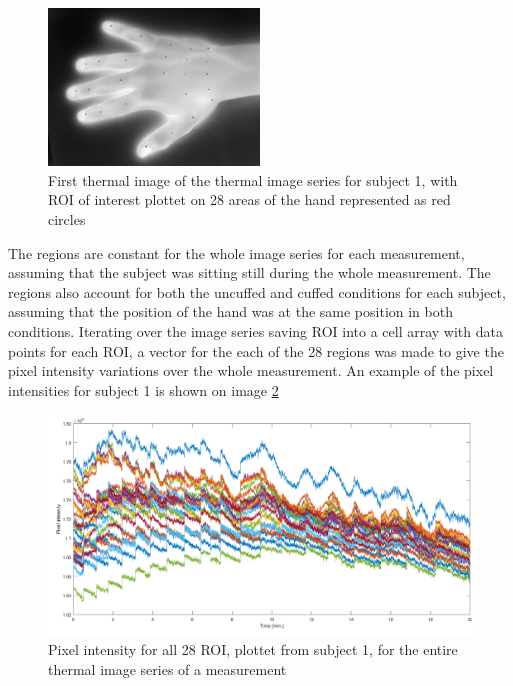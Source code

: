 \begin{figure}[H]
	\includegraphics[width=0.5\textwidth]{figures/roiHand}  %
	\caption{First thermal image of the thermal image series for subject 1, with ROI of interest plottet on 28 areas of the hand represented as red circles}
	\label{fig:roiHand}  %
\end{figure}

The regions are constant for the whole image series for each measurement, assuming that the subject was sitting still during the whole measurement. The regions also account for both the uncuffed and cuffed conditions for each subject, assuming that the position of the hand was at the same position in both conditions. 
Iterating over the image series saving ROI into a cell array with data points for each ROI, a vector for the each of the 28 regions was made to give the pixel intensity variations over the whole measurement. 
An example of the pixel intensities for subject 1 is shown on image \ref{fig:Intensities}

\begin{figure}[H]
	\includegraphics[width=1\textwidth]{figures/Intensities}  %
	\caption{Pixel intensity for all 28 ROI, plottet from subject 1, for the entire thermal image series of a measurement}
	\label{fig:Intensities}  %
\end{figure}

